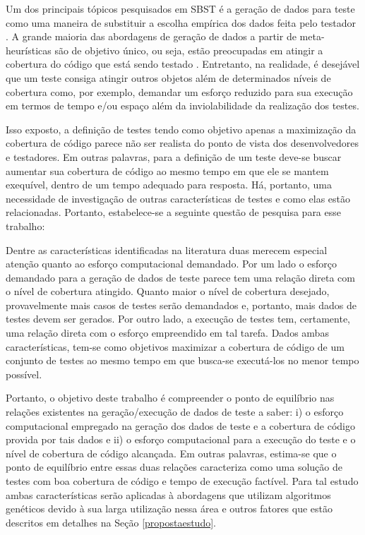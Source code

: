 Um dos principais tópicos pesquisados em SBST é a geração de dados para teste como uma maneira de substituir a escolha empírica dos dados feita pelo testador \cite{mcminn2004search}. A grande maioria das abordagens de geração de dados a partir de meta-heurísticas são de objetivo único, ou seja, estão preocupadas em atingir a cobertura do código que está sendo testado \cite{harman2015achievements}. Entretanto, na realidade, é desejável que um teste consiga atingir outros objetos além de determinados níveis de cobertura como, por exemplo, demandar um esforço reduzido para sua execução em termos de tempo e/ou espaço além da inviolabilidade da realização dos testes\cite{harman2015achievements}.

Isso exposto, a definição de testes tendo como objetivo apenas a maximização da cobertura de código parece não ser realista do ponto de vista dos desenvolvedores e testadores. Em outras palavras, para a definição de um teste deve-se buscar aumentar sua cobertura de código ao mesmo tempo em que ele se mantem exequível, dentro de um tempo adequado para resposta. Há, portanto, uma necessidade de investigação de outras características de testes e como elas estão relacionadas. Portanto, estabelece-se a seguinte questão de pesquisa para esse trabalho:


Dentre as características identificadas na literatura duas merecem especial atenção quanto ao esforço computacional demandado. Por um lado o esforço demandado para a geração de dados de teste parece tem uma relação direta com o nível de cobertura atingido. Quanto maior o nível de cobertura desejado, provavelmente mais casos de testes serão demandados e, portanto, mais dados de testes devem ser gerados. Por outro lado, a execução de testes tem, certamente, uma relação direta com o esforço empreendido em tal tarefa. Dados ambas características, tem-se como objetivos maximizar a cobertura de código de um conjunto de testes ao mesmo tempo em que busca-se executá-los no menor tempo possível.

Portanto, o objetivo deste trabalho é compreender o ponto de equilíbrio nas relações existentes na geração/execução de dados de teste a saber: i) o esforço computacional empregado na geração dos dados de teste e a cobertura de código provida por tais dados e ii) o esforço computacional para a execução do teste e o nível de cobertura de código alcançada. Em outras palavras, estima-se que o ponto de equilíbrio entre essas duas relações caracteriza como uma solução de testes com boa cobertura de código e tempo de execução factível. Para tal estudo ambas características serão aplicadas à abordagens que utilizam algoritmos genéticos devido à sua larga utilização nessa área e outros fatores que estão  descritos em detalhes na Seção \ref{propostaestudo}.


